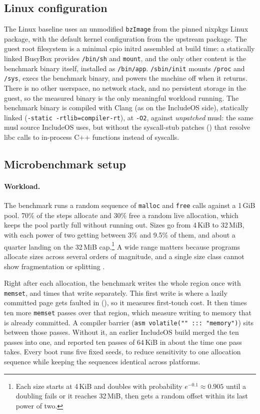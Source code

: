\documentclass[12pt]{report}
\newcommand{\fullref}[1]{\Cref{#1}}
\renewcommand{\_}{\origunderscore\allowbreak}
\begin{document}
\subsection{Linux configuration}

The Linux baseline uses an unmodified \texttt{bzImage} from the pinned nixpkgs Linux package, with the default kernel configuration from the upstream package. The guest root filesystem is a minimal cpio initrd assembled at build time: a statically linked BusyBox provides \texttt{/bin/sh} and \texttt{mount}, and the only other content is the benchmark binary itself, installed as \texttt{/bin/app}. \texttt{/sbin/init} mounts \texttt{/proc} and \texttt{/sys}, execs the benchmark binary, and powers the machine off when it returns. There is no other userspace, no network stack, and no persistent storage in the guest, so the measured binary is the only meaningful workload running. The benchmark binary is compiled with Clang (as on the IncludeOS side), statically linked (\texttt{-static -rtlib=compiler-rt}), at \texttt{-O2}, against \emph{unpatched} musl: the same musl source IncludeOS uses, but without the syscall-stub patches (\fullref{sec:impl-musl}) that resolve libc calls to in-process C++ functions instead of syscalls.

\subsection{Microbenchmark setup}

\paragraph{Workload.} The benchmark runs a random sequence of \texttt{malloc} and \texttt{free} calls against a 1\,GiB pool. 70\% of the steps allocate and 30\% free a random live allocation, which keeps the pool partly full without running out. Sizes go from 4\,KiB to 32\,MiB, with each power of two getting between 3\% and 9.5\% of them, and about a quarter landing on the 32\,MiB cap.\footnote{Each size starts at 4\,KiB and doubles with probability $e^{-0.1} \approx 0.905$ until a doubling fails or it reaches 32\,MiB, then gets a random offset within its last power of two.} A wide range matters because programs allocate sizes across several orders of magnitude, and a single size class cannot show fragmentation or splitting \cite{wilson1995survey,johnstone1998fragmentation}.

Right after each allocation, the benchmark writes the whole region once with \texttt{memset}, and times that write separately. This first write is where a lazily committed page gets faulted in (\fullref{sssec:posix-memory}), so it measures first-touch cost. It then times ten more \texttt{memset} passes over that region, which measure writing to memory that is already committed. A compiler barrier (\texttt{asm volatile("" ::: "memory")}) sits between those passes. Without it, an earlier IncludeOS build merged the ten passes into one, and reported ten passes of 64\,KiB in about the time one pass takes. Every boot runs five fixed seeds, to reduce sensitivity to one allocation sequence while keeping the sequences identical across platforms.
\end{document}
